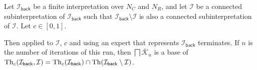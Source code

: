 \begin{Theorem}
  \label{thm:model-exploration-by-confidence}
  Let $\mathcal{I}_{\mathsf{back}}$ be a finite interpretation over $N_{C}$ and $N_{R}$,
  and let $\mathcal{I}$ be a connected subinterpretation of $\mathcal{I}_{\mathsf{back}}$
  such that $\mathcal{I}_{\mathsf{back}} \setminus \mathcal{I}$ is also a connected
  subinterpretation of $\mathcal{I}$.  Let $c \in [0,1]$.

  Then  applied to $\mathcal{I}$, $c$ and using
  an expert that represents $\mathcal{I}_{\mathsf{back}}$ terminates.  If $n$ is the
  number of iterations of this run, then $\bigsqcap \bar{\mathcal{K}}_{n}$ is a base of
  $\operatorname{Th}_{c}(\mathcal{I}_{\mathsf{back}}, \mathcal{I}) =
  \operatorname{Th}_{c}(\mathcal{I}_{\mathsf{back}}) \cap \operatorname{Th}(\mathcal{I}_{\mathsf{back}} \setminus
  \mathcal{I})$.
\end{Theorem}

%


